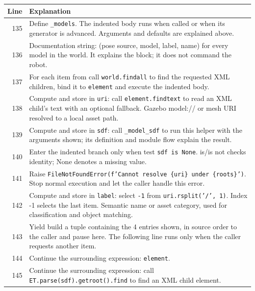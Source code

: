 \documentclass[11pt,a4paper]{book}
\begin{document}
\begin{longtable}{r p{}}

\textbf{Line} & \textbf{Explanation} \\ \hline \endhead

135 & Define \texttt{\_models}. The indented body runs when called or when its generator is advanced. Arguments and defaults are explained above. \\

136 & Documentation string: (pose source, model, label, name) for every model in the world. It explains the block; it does not command the robot. \\

137 & For each item from call \texttt{world.findall} to find the requested XML children, bind it to \texttt{element} and execute the indented body. \\

138 & Compute and store in \texttt{uri}: call \texttt{element.findtext} to read an XML child's text with an optional fallback. Gazebo model:// or mesh URI resolved to a local asset path. \\

139 & Compute and store in \texttt{sdf}: call \texttt{\_model\_sdf} to run this helper with the arguments shown; its definition and module flow explain the result.  \\

140 & Enter the indented branch only when test \texttt{sdf is None}. is/is not checks identity; None denotes a missing value. \\

141 & Raise \texttt{FileNotFoundError(f'Cannot resolve \{uri\} under \{roots\}')}. Stop normal execution and let the caller handle this error. \\

142 & Compute and store in \texttt{label}: select \texttt{-1} from \texttt{uri.rsplit('/', 1)}. Index -1 selects the last item. Semantic name or asset category, used for classification and object matching. \\

143 & Yield build a tuple containing the 4 entries shown, in source order to the caller and pause here. The following line runs only when the caller requests another item. \\

144 & Continue the surrounding expression: \texttt{element}. \\

145 & Continue the surrounding expression: call \texttt{ET.parse(sdf).getroot().find} to find an XML child element. \\


\end{longtable}
\end{document}

